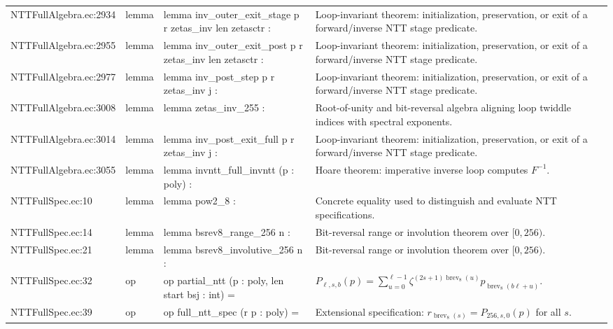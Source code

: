 \documentclass[10pt]{article}
\begin{document}
\begin{longtable}{L{0.11\textwidth}L{0.05\textwidth}L{0.38\textwidth}L{0.42\textwidth}}
NTTFullAlgebra.\allowbreak{}ec:\allowbreak{}2934 & lemma & {\ttfamily\scriptsize lemma inv\_outer\_exit\_stage p r zetas\_inv len zetasctr :} & Loop-invariant theorem: initialization, preservation, or exit of a forward/inverse NTT stage predicate. \\
NTTFullAlgebra.\allowbreak{}ec:\allowbreak{}2955 & lemma & {\ttfamily\scriptsize lemma inv\_outer\_exit\_post p r zetas\_inv len zetasctr :} & Loop-invariant theorem: initialization, preservation, or exit of a forward/inverse NTT stage predicate. \\
NTTFullAlgebra.\allowbreak{}ec:\allowbreak{}2977 & lemma & {\ttfamily\scriptsize lemma inv\_post\_step p r zetas\_inv j :} & Loop-invariant theorem: initialization, preservation, or exit of a forward/inverse NTT stage predicate. \\
NTTFullAlgebra.\allowbreak{}ec:\allowbreak{}3008 & lemma & {\ttfamily\scriptsize lemma zetas\_inv\_255 :} & Root-of-unity and bit-reversal algebra aligning loop twiddle indices with spectral exponents. \\
NTTFullAlgebra.\allowbreak{}ec:\allowbreak{}3014 & lemma & {\ttfamily\scriptsize lemma inv\_post\_exit\_full p r zetas\_inv j :} & Loop-invariant theorem: initialization, preservation, or exit of a forward/inverse NTT stage predicate. \\
NTTFullAlgebra.\allowbreak{}ec:\allowbreak{}3055 & lemma & {\ttfamily\scriptsize lemma invntt\_full\_invntt (p : poly) :} & Hoare theorem: imperative inverse loop computes $F^{-1}$. \\
NTTFullSpec.\allowbreak{}ec:\allowbreak{}10 & lemma & {\ttfamily\scriptsize lemma pow2\_8 :} & Concrete equality used to distinguish and evaluate NTT specifications. \\
NTTFullSpec.\allowbreak{}ec:\allowbreak{}14 & lemma & {\ttfamily\scriptsize lemma bsrev8\_range\_256 n :} & Bit-reversal range or involution theorem over $[0,256)$. \\
NTTFullSpec.\allowbreak{}ec:\allowbreak{}21 & lemma & {\ttfamily\scriptsize lemma bsrev8\_involutive\_256 n :} & Bit-reversal range or involution theorem over $[0,256)$. \\
NTTFullSpec.\allowbreak{}ec:\allowbreak{}32 & op & {\ttfamily\scriptsize op partial\_ntt (p : poly, len start bsj : int) =} & $P_{\ell,s,b}(p)=\sum_{u=0}^{\ell-1}\zeta^{(2s+1)\operatorname{brev}_8(u)}p_{\operatorname{brev}_8(b\ell+u)}$. \\
NTTFullSpec.\allowbreak{}ec:\allowbreak{}39 & op & {\ttfamily\scriptsize op full\_ntt\_spec (r p : poly) =} & Extensional specification: $r_{\operatorname{brev}_8(s)}=P_{256,s,0}(p)$ for all $s$. \\

\end{longtable}
\end{document}
